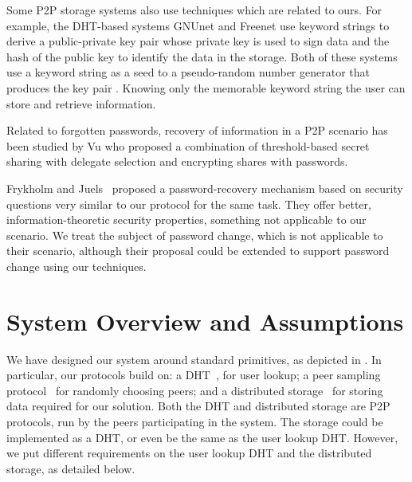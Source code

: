 Some P2P storage systems also use techniques which are related to ours.
For example, the DHT-based systems 
GNUnet and Freenet use keyword strings to derive a public-private key pair
whose private key is used to sign data and the hash of the public key to
identify the data in the storage. Both of these systems use a keyword string
as a seed to a pseudo-random number generator that produces the key pair
\cite{Clarke10,Bennett03}. Knowing only the memorable keyword string the user
can store and retrieve information.


Related to forgotten passwords, recovery of information in a
P2P scenario has been studied by Vu\etal \cite{Vu_Aberer_Buchegger_Datta_2009}
who proposed a combination of threshold-based secret sharing with delegate
selection and encrypting shares with passwords.

Frykholm and Juels~\cite{FrykholmJ01} proposed a password-recovery mechanism
based on security questions very similar to our protocol for the same task.
They offer better, information-theoretic security properties, something
not applicable to our scenario. %
We treat the subject of password change, which is not
applicable to their scenario, although their proposal could be extended to support
password change using our techniques.

\section{System Overview and Assumptions} 

We have designed our system around standard primitives, as
depicted in .  In particular, our protocols
build on: a DHT~\cite{WehrleGR05,JimenezOK11}, for user lookup; a peer sampling
protocol~\cite{JelasityVGKS07,BortnikovGKKS09} for randomly choosing peers; and a distributed
storage~\cite{BennettGHP02,RheaEGWZK03} for storing data required for our
solution. Both the DHT and distributed storage are P2P protocols, run by the
peers participating in the system. The storage could be implemented as a DHT,
or even be the same as the user lookup DHT. However, we put different
requirements on the user lookup DHT and the distributed storage, as detailed
below.

